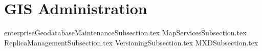 \documentclass{book}
\title{}  %
\begin{document}
\ifstandalone
\maketitle %
\clearpage
\tableofcontents %
\clearpage
\fi


\section{GIS Administration}
{enterpriseGeodatabaseMaintenanceSubsection.tex}
\clearpage
{MapServicesSubsection.tex}
\clearpage
{ReplicaManagementSubsection.tex}
\clearpage
{VersioningSubsection.tex}
\clearpage
{MXDSubsection.tex}
\end{document}
